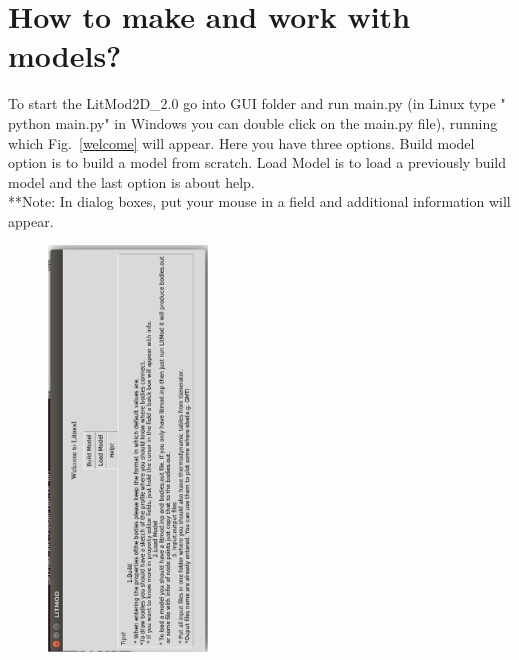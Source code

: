 \documentclass[14pt]{article}
\begin{document}
\vspace{50pt}
\section{How to make and work with models?}
To start the LitMod2D\_2.0 go into GUI folder and run main.py (in Linux type " python main.py" in Windows you can double click on the main.py file), running which Fig.~\ref{welcome} will appear. Here you have three options. Build model option is to build a model from scratch. Load Model is to load a previously build model and the last option is about help.\\
**Note: In dialog boxes, put your mouse in a field and additional information will appear. 
\begin{figure}
\centering \includegraphics[width=10pc,angle=-90]{./welcome.eps}

\end{figure}
\end{document}
